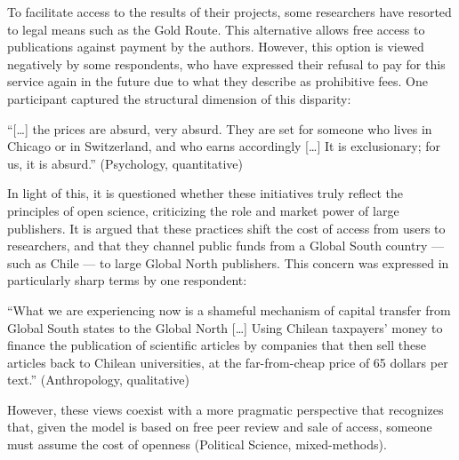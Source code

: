 \documentclass[
  english,
  letterpaper,
]{article}
\begin{document}
To facilitate access to the results of their projects, some researchers
have resorted to legal means such as the Gold Route. This alternative
allows free access to publications against payment by the authors.
However, this option is viewed negatively by some respondents, who have
expressed their refusal to pay for this service again in the future due
to what they describe as prohibitive fees. One participant captured the
structural dimension of this disparity:

\begin{tcolorbox}[enhanced jigsaw, opacityback=0, left=2mm, breakable, colframe=quarto-callout-color-frame, arc=.35mm, leftrule=.75mm, toprule=.15mm, bottomrule=.15mm, colback=white, rightrule=.15mm]

``{[}\ldots{]} the prices are absurd, very absurd. They are set for
someone who lives in Chicago or in Switzerland, and who earns
accordingly {[}\ldots{]} It is exclusionary; for us, it is absurd.''
(Psychology, quantitative)

\end{tcolorbox}

In light of this, it is questioned whether these initiatives truly
reflect the principles of open science, criticizing the role and market
power of large publishers. It is argued that these practices shift the
cost of access from users to researchers, and that they channel public
funds from a Global South country --- such as Chile --- to large Global
North publishers. This concern was expressed in particularly sharp terms
by one respondent:

\begin{tcolorbox}[enhanced jigsaw, opacityback=0, left=2mm, breakable, colframe=quarto-callout-color-frame, arc=.35mm, leftrule=.75mm, toprule=.15mm, bottomrule=.15mm, colback=white, rightrule=.15mm]

``What we are experiencing now is a shameful mechanism of capital
transfer from Global South states to the Global North {[}\ldots{]} Using
Chilean taxpayers' money to finance the publication of scientific
articles by companies that then sell these articles back to Chilean
universities, at the far-from-cheap price of 65 dollars per text.''
(Anthropology, qualitative)

\end{tcolorbox}

However, these views coexist with a more pragmatic perspective that
recognizes that, given the model is based on free peer review and sale
of access, someone must assume the cost of openness (Political Science,
mixed-methods).
\end{document}

